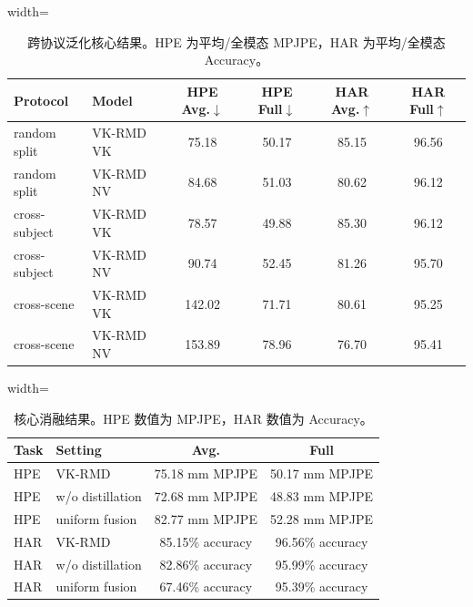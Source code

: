 \begin{table}[t]
\centering
\caption{跨协议泛化核心结果。HPE 为平均/全模态 MPJPE，HAR 为平均/全模态 Accuracy。}
\label{tab:protocol_cn}
\scriptsize
\begin{adjustbox}{width=\textwidth}
\begin{tabular}{llcccc}
\toprule
Protocol & Model & HPE Avg.$\downarrow$ & HPE Full$\downarrow$ & HAR Avg.$\uparrow$ & HAR Full$\uparrow$ \\
\midrule
random split & VK-RMD VK & 75.18 & 50.17 & 85.15 & 96.56 \\
random split & VK-RMD NV & 84.68 & 51.03 & 80.62 & 96.12 \\
\midrule
cross-subject & VK-RMD VK & 78.57 & 49.88 & 85.30 & 96.12 \\
cross-subject & VK-RMD NV & 90.74 & 52.45 & 81.26 & 95.70 \\
\midrule
cross-scene & VK-RMD VK & 142.02 & 71.71 & 80.61 & 95.25 \\
cross-scene & VK-RMD NV & 153.89 & 78.96 & 76.70 & 95.41 \\
\bottomrule
\end{tabular}
\end{adjustbox}
\end{table}

\begin{table}[H]
\centering
\caption{核心消融结果。HPE 数值为 MPJPE，HAR 数值为 Accuracy。}
\label{tab:ablation_cn}
\scriptsize
\begin{adjustbox}{width=\linewidth}
\begin{tabular}{llcc}
\toprule
Task & Setting & Avg. & Full \\
\midrule
HPE & VK-RMD & 75.18 mm MPJPE & 50.17 mm MPJPE \\
HPE & w/o distillation & 72.68 mm MPJPE & 48.83 mm MPJPE \\
HPE & uniform fusion & 82.77 mm MPJPE & 52.28 mm MPJPE \\
HAR & VK-RMD & 85.15\% accuracy & 96.56\% accuracy \\
HAR & w/o distillation & 82.86\% accuracy & 95.99\% accuracy \\
HAR & uniform fusion & 67.46\% accuracy & 95.39\% accuracy \\
\bottomrule
\end{tabular}
\end{adjustbox}
\end{table}


